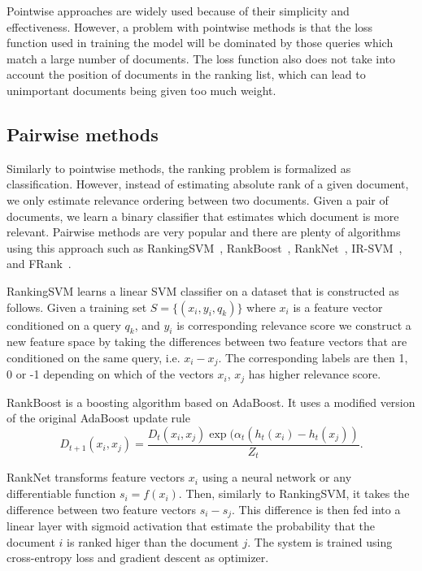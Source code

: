 \documentclass[english]{article}
\theoremstyle{definition}
\begin{document}
\begin{multicols}{2}
Pointwise approaches are widely used because of their simplicity and effectiveness.  However, a problem with pointwise methods is that the loss function used in training the model will be dominated by those queries which match a large number of documents.  The loss function also does not take into account the position of documents in the ranking list, which can lead to unimportant documents being given too much weight.

\subsection{Pairwise methods}

Similarly to pointwise methods, the ranking problem is formalized as classification. However, instead of estimating absolute rank of a given document, we only estimate relevance ordering between two documents. Given a pair of documents, we learn a binary classifier that estimates which document is more relevant. Pairwise methods are very popular and there are plenty of algorithms using this approach such as RankingSVM~\cite{herbrich1999support,herbrich2000large,joachims2002optimizing}, RankBoost~\cite{freund2003efficient}, RankNet~\cite{burges2005learning}, IR-SVM~\cite{cao2006adapting},  and FRank~\cite{tsai2007frank}.

RankingSVM learns a linear SVM classifier on a dataset that is constructed as follows. Given a training set $S = \{(x_i, y_i, q_k)\}$ where $x_i$ is a feature vector conditioned on a query $q_k$, and $y_i$ is corresponding relevance score we construct a new feature space by taking the differences between two feature vectors that are conditioned on the same query, i.e. $x_i - x_j$. The corresponding labels are then 1, 0 or -1 depending on which of the vectors $x_i$, $x_j$ has higher relevance score.

RankBoost is a boosting algorithm based on AdaBoost. It uses a modified version of the original AdaBoost update rule $$D_{t+1}(x_i,x_j) = \frac{D_t(x_i,x_j) \exp(\alpha_t (h_t(x_i) - h_t(x_j))}{Z_t}.$$

RankNet transforms feature vectors $x_i$ using a neural network or any differentiable function $s_i = f(x_i)$. Then, similarly to RankingSVM, it takes the difference between two feature vectors $s_i - s_j$. This difference is then fed into a linear layer with sigmoid activation that estimate the probability that the document $i$ is ranked higer than the document $j$. The system is trained using cross-entropy loss and gradient descent as optimizer.


\end{multicols}
\end{document}
